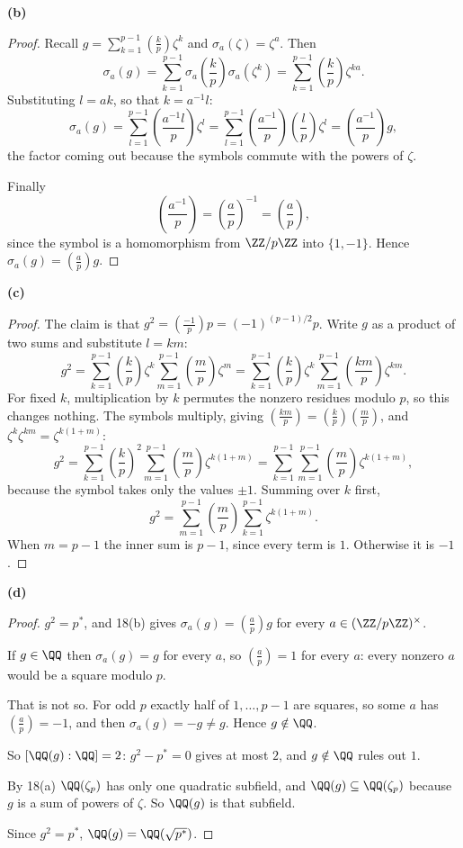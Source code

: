 \documentclass[11pt]{article}
\begin{document}
\noindent\textbf{(b)}
\begin{proof}
Recall $g=\sum_{k=1}^{p-1}\left(\frac{k}{p}\right)\zeta^{k}$ and $\sigma_a(\zeta)=\zeta^{a}$. Then
\[
\sigma_a(g)=\sum_{k=1}^{p-1}\sigma_a\!\left(\frac{k}{p}\right)\sigma_a(\zeta^{k})=\sum_{k=1}^{p-1}\left(\frac{k}{p}\right)\zeta^{ka}.
\]
Substituting $l=ak$, so that $k=a^{-1}l$:
\[
\sigma_a(g)=\sum_{l=1}^{p-1}\left(\frac{a^{-1}l}{p}\right)\zeta^{l}=\sum_{l=1}^{p-1}\left(\frac{a^{-1}}{p}\right)\left(\frac{l}{p}\right)\zeta^{l}=\left(\frac{a^{-1}}{p}\right)g,
\]
the factor coming out because the symbols commute with the powers of $\zeta$.

Finally
\[
\left(\frac{a^{-1}}{p}\right)=\left(\frac{a}{p}\right)^{-1}=\left(\frac{a}{p}\right),
\]
since the symbol is a homomorphism from $\ZZ/p\ZZ$ into $\{1,-1\}$. Hence $\sigma_a(g)=\left(\frac{a}{p}\right)g$.
\end{proof}
\noindent\textbf{(c)}
\begin{proof}
The claim is that $g^{2}=\left(\frac{-1}{p}\right)p=(-1)^{(p-1)/2}p$. Write $g$ as a product of two sums and substitute $l=km$:
\[
g^{2}=\sum_{k=1}^{p-1}\left(\frac{k}{p}\right)\zeta^{k}\sum_{m=1}^{p-1}\left(\frac{m}{p}\right)\zeta^{m}=\sum_{k=1}^{p-1}\left(\frac{k}{p}\right)\zeta^{k}\sum_{m=1}^{p-1}\left(\frac{km}{p}\right)\zeta^{km}.
\]
For fixed $k$, multiplication by $k$ permutes the nonzero residues modulo $p$, so this changes nothing. The symbols multiply, giving $\left(\frac{km}{p}\right)=\left(\frac{k}{p}\right)\left(\frac{m}{p}\right)$, and $\zeta^{k}\zeta^{km}=\zeta^{k(1+m)}$:
\[
g^{2}=\sum_{k=1}^{p-1}\left(\frac{k}{p}\right)^{2}\sum_{m=1}^{p-1}\left(\frac{m}{p}\right)\zeta^{k(1+m)}=\sum_{k=1}^{p-1}\sum_{m=1}^{p-1}\left(\frac{m}{p}\right)\zeta^{k(1+m)},
\]
because the symbol takes only the values $\pm1$. Summing over $k$ first,
\[
g^{2}=\sum_{m=1}^{p-1}\left(\frac{m}{p}\right)\sum_{k=1}^{p-1}\zeta^{k(1+m)}.
\]
When $m=p-1$ the inner sum is $p-1$, since every term is $1$. Otherwise it is $-1$.
\end{proof}
\noindent\textbf{(d)}
\begin{proof}
$g^{2}=p^{*}$, and 18(b) gives $\sigma_a(g)=\left(\frac ap\right)g$ for every $a\in(\ZZ/p\ZZ)^\times$.

If $g\in\QQ$ then $\sigma_a(g)=g$ for every $a$, so $\left(\frac ap\right)=1$ for every $a$: every nonzero $a$ would be a square modulo $p$.

That is not so. For odd $p$ exactly half of $1,\dots,p-1$ are squares, so some $a$ has $\left(\frac ap\right)=-1$, and then $\sigma_a(g)=-g\neq g$. Hence $g\notin\QQ$.

So $[\QQ(g):\QQ]=2$: $g^{2}-p^{*}=0$ gives at most $2$, and $g\notin\QQ$ rules out $1$.

By 18(a) $\QQ(\zeta_p)$ has only one quadratic subfield, and $\QQ(g)\subseteq\QQ(\zeta_p)$ because $g$ is a sum of powers of $\zeta$. So $\QQ(g)$ is that subfield.

Since $g^{2}=p^{*}$, $\QQ(g)=\QQ(\sqrt{p^{*}})$.
\end{proof}
\end{document}
